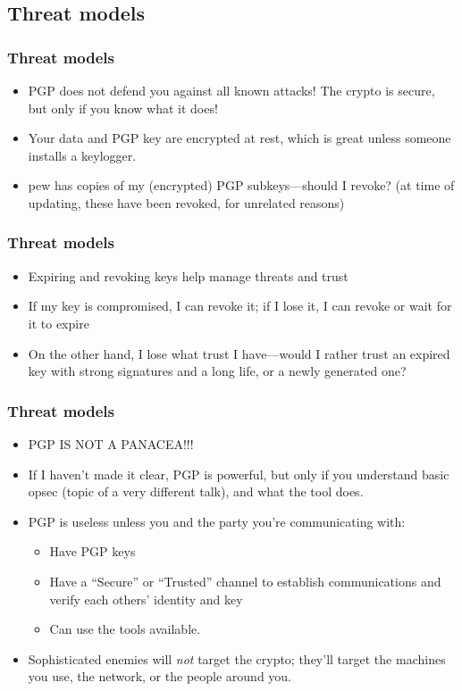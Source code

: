 \documentclass[aspectratio=1610,bigger,utf8]{beamer}
\begin{document}
\subsection{Threat models}
\begin{frame}
	\frametitle{Threat models}
	\begin{itemize}
		\item PGP does not defend you against all known attacks! The
			\alert{crypto is secure}, but only if you know what it
			does!
		\item Your data and PGP key are \alert{encrypted at rest},
			which is great unless someone installs a
			\alert{keylogger}.
		\item \alert{pew} has copies of my (encrypted) PGP
				subkeys---should I revoke? (at time of updating, these have
				been revoked, for unrelated reasons)
	\end{itemize}
\end{frame}
\begin{frame}
	\frametitle{Threat models}
	\begin{itemize}
		\item Expiring and revoking keys help manage threats and trust
		\item If my key is compromised, I can revoke it; if I lose it,
			I can revoke or wait for it to expire
		\item On the other hand, I lose what trust I have---would I
			rather trust an expired key with strong signatures and
			a long life, or a newly generated one?
	\end{itemize}
\end{frame}
\begin{frame}
	\frametitle{Threat models}
	\begin{itemize}
		\item \alert{PGP IS NOT A PANACEA!!!}
		\item If I haven't made it clear, PGP is powerful, but only if you
			understand basic opsec (topic of a very different talk), and
			what the tool does.
		\item PGP is useless unless you and the party you're communicating with:
			\begin{itemize}
				\item Have PGP keys
				\item Have a ``Secure'' or ``Trusted'' channel
					to establish communications and verify
					each others' identity and key
				\item Can use the tools available.
			\end{itemize}
		\item Sophisticated enemies will \emph{not} target the crypto;
			they'll target the machines you use, the network, or
			the people around you.
	\end{itemize}
\end{frame}
\end{document}
